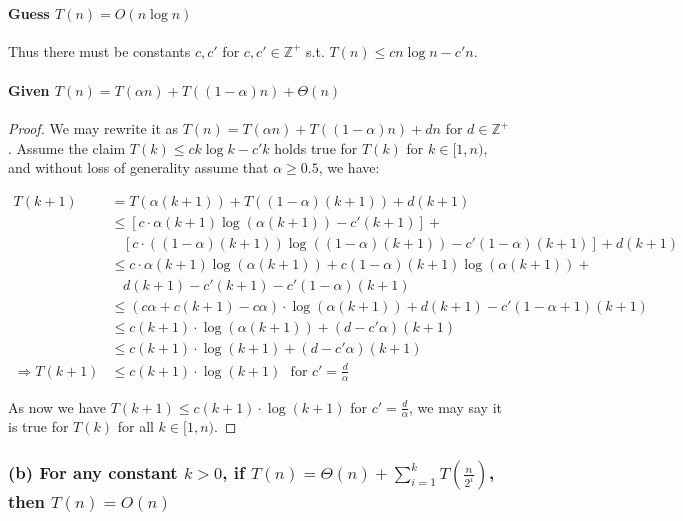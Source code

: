 \documentclass[11pt]{article}
\begin{document}
\paragraph{Guess $T(n) = O(n \log n)$\newline}
Thus there must be constants $c, c'$ for $c, c'\in \mathbb{Z^+}$ s.t. $T(n) \leq cn \log n - c'n$.

\paragraph{Given $T(n) = T(\alpha n) + T((1-\alpha)n) + \Theta(n)$\newline}
\begin{proof}
We may rewrite it as $T(n) = T(\alpha n) + T((1-\alpha)n) + dn$ for $d \in \mathbb{Z^+}$. Assume the claim $T(k) \leq ck \log k - c'k$ holds true for $T(k)$ for $k \in [1, n)$, and without loss of generality assume that $\alpha \geq 0.5$, we have:

\begin{align}
    T(k + 1) &= T(\alpha(k + 1)) + T((1-\alpha)(k+1)) + d(k + 1) \\
    &\leq [c \cdot \alpha (k + 1) \log(\alpha(k + 1)) - c'(k+1)] + \nonumber\\
    & \ \ \ \ [c \cdot ((1- \alpha)(k + 1))\log((1-\alpha)(k + 1)) - c'(1-\alpha)(k + 1)]+ d(k + 1) \nonumber \\
    &\leq c \cdot \alpha (k + 1) \log(\alpha(k + 1)) + c(1-\alpha)(k + 1)\log(\alpha(k+1)) +\nonumber \\
    & \ \ \ \  d(k + 1) - c'(k+1)- c'(1-\alpha)(k + 1) \nonumber \\
    &\leq (c \alpha + c(k + 1) -  c \alpha) \cdot \log(\alpha(k + 1)) +  d(k + 1) -  c'(1-\alpha + 1)(k + 1)\nonumber \\
    &\leq c(k + 1) \cdot \log(\alpha(k + 1)) +  (d-c'\alpha)(k + 1)\nonumber \\
    &\leq c(k + 1) \cdot \log(k + 1)+  (d-c'\alpha)(k + 1)\nonumber \\
    \Longrightarrow T(k + 1) &\leq c(k + 1) \cdot \log(k + 1) \ \ \ \text{for $c'= \frac{d}{\alpha}$}
\end{align}

As now we have $T(k + 1) \leq c(k + 1) \cdot \log(k + 1)$ for $c'= \frac{d}{\alpha}$, we may say it is true for $T(k)$ for all $k \in [1, n)$.
\end{proof}


\subsubsection{(b) For any constant $k > 0$, if $T(n) = \Theta(n) + \sum^{k}_{i = 1} T(\frac{n}{2^i})$, then $T(n) = O(n)$}
\end{document}
